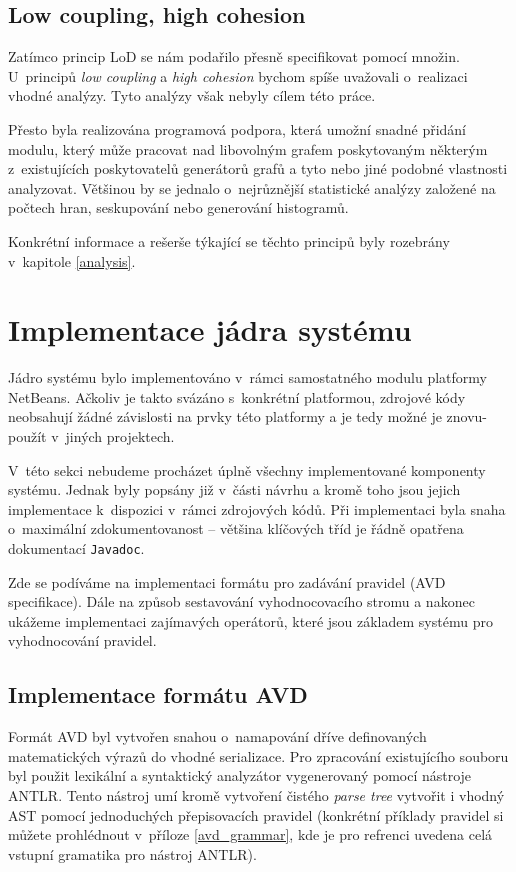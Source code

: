 \subsection{Low coupling, high cohesion}
Zatímco princip LoD se nám podařilo přesně specifikovat pomocí množin. U~principů \emph{low coupling} a \emph{high cohesion} bychom spíše uvažovali o~realizaci vhodné analýzy. Tyto analýzy však nebyly cílem této práce.

Přesto byla realizována programová podpora, která umožní snadné přidání modulu, který může pracovat nad libovolným grafem poskytovaným některým z~existujících poskytovatelů generátorů grafů a tyto nebo jiné podobné vlastnosti analyzovat. Většinou by se jednalo o~nejrůznější statistické analýzy založené na počtech hran, seskupování nebo generování histogramů.

Konkrétní informace a rešerše týkající se těchto principů byly rozebrány v~kapitole \ref{analysis}.

\section{Implementace jádra systému}
Jádro systému bylo implementováno v~rámci samostatného modulu platformy NetBeans. Ačkoliv je takto svázáno s~konkrétní platformou, zdrojové kódy neobsahují žádné závislosti na prvky této platformy a je tedy možné je znovu-použít v~jiných projektech.

V~této sekci nebudeme procházet úplně všechny implementované komponenty systému. Jednak byly popsány již v~části návrhu a kromě toho jsou jejich implementace k~dispozici v~rámci zdrojových kódů. Při implementaci byla snaha o~maximální zdokumentovanost -- většina klíčových tříd je řádně opatřena dokumentací \verb-Javadoc-.

Zde se podíváme na implementaci formátu pro zadávání pravidel (AVD specifikace). Dále na způsob sestavování vyhodnocovacího stromu a nakonec ukážeme implementaci zajímavých operátorů, které jsou základem systému pro vyhodnocování pravidel.

\subsection{Implementace formátu AVD}
Formát AVD byl vytvořen snahou o~namapování dříve definovaných matematických výrazů do vhodné serializace. Pro zpracování existujícího souboru byl použit lexikální a syntaktický analyzátor vygenerovaný pomocí nástroje ANTLR. Tento nástroj umí kromě vytvoření čistého \emph{parse tree} vytvořit i vhodný AST pomocí jednoduchých přepisovacích pravidel (konkrétní příklady pravidel si můžete prohlédnout v~příloze \ref{avd_grammar}, kde je pro refrenci uvedena celá vstupní gramatika pro nástroj ANTLR).

